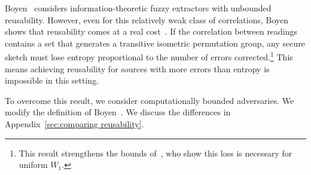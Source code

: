 \documentclass[11pt]{article}
\newcommand{\apref}[1]{\mbox{Appendix~\ref{#1}}}
\newcommand{\class}[1]{{\ensuremath{\mathsf{#1}}}}
\newcommand{\gen}{\ensuremath{\class{Gen}}\xspace}
\newcommand{\rep}{\ensuremath{\class{Rep}}\xspace}
\newtheorem{definition}[theorem]{Definition}
\newcommand{\authnote}[2]{{\textcolor{red}{\textsf{#1 notes: }\textcolor{blue}{ #2}}\marginpar{\textcolor{red}{\textbf{!!!!!}}}}}
\newcommand{\authnote}[2]{}
\newcommand{\bnote}[1]{{\authnote{Ben}{#1}}}
\begin{document}
Boyen~\cite{Boyen2004} considers information-theoretic fuzzy extractors with unbounded reusability.  
However, even for this relatively weak class of correlations, Boyen shows that reusability comes at a real cost~\cite[Theorem 11]{Boyen2004}.  If the correlation between readings contains a set that generates a transitive isometric permutation group, any secure sketch must lose entropy proportional to the number of errors corrected.\footnote{This result strengthens the bounds of~\cite[Appendix C]{DBLP:journals/siamcomp/DodisORS08}, who show this loss is necessary for uniform $W_1$.} This means achieving reusability for sources with more errors than entropy is impossible in this setting.
%

To overcome this result, we consider computationally bounded adversaries.
We modify the definition of Boyen~\cite[Definition 7]{Boyen2004}.  We discuss the differences in \apref{sec:comparing reusability}.
\end{document}
